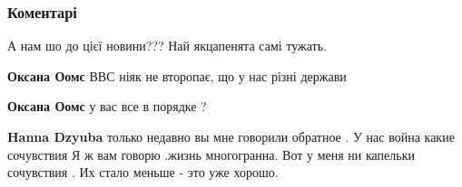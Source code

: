  
 
 
 
 
\subsubsection{Коментарі}

\begin{itemize}
 
А нам шо до цієї новини??? Най якцапенята самі тужать.

\begin{itemize}
 
\textbf{Оксана Оомс} ВВС ніяк не второпає, що у нас різні держави

 
\textbf{Оксана Оомс} у вас все в порядке ?

\begin{itemize}
 
\textbf{Hanna Dzyuba} только недавно вы мне говорили обратное . У нас война какие сочувствия
Я ж вам говорю .жизнь многогранна.
Вот у меня ни капельки сочувствия . Их стало меньше - это уже хорошо.

 

\end{itemize}
\end{itemize}
\end{itemize}
